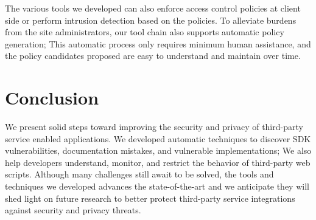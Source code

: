 The various tools we developed can also enforce access control policies at client side or perform intrusion detection based on the policies.  To alleviate burdens from the site administrators, our tool chain also supports automatic policy generation;  This automatic process only requires minimum human assistance, and the policy candidates proposed are easy to understand and maintain over time.


\section{Conclusion}
\label{sec:conclusion_final}

We present solid steps toward improving the security and privacy of third-party service enabled applications.  We developed automatic techniques to discover SDK vulnerabilities, documentation mistakes, and vulnerable implementations; We also help developers understand, monitor, and restrict the behavior of third-party web scripts.  Although many challenges still await to be solved, the tools and techniques we developed advances the state-of-the-art and we anticipate they will shed light on future research to better protect third-party service integrations against security and privacy threats.
